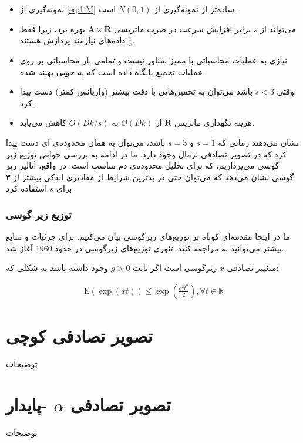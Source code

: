 \begin{itemize}
\item
نمونه‌گیری از 
\autoref{eq:1iM}
ساده‌تر از نمونه‌گیری از
$N(0,1)$
است.
\item
می‌تواند از 
$s$
برابر افزایش سرعت در ضرب ماتریسی 
$\mathbf{A} \times \mathbf{R}$
بهره برد، زیرا فقط
$\frac{1}{s}$
داده‌های نیازمند پردازش هستند.
\item
نیازی به عملیات محاسباتی با ممیز شناور نیست و تمامی بار محاسباتی بر روی عملیات تجمیع پایگاه داده است که به خوبی بهینه شده.
\item
وقتی 
$s<3$
باشد می‌توان به تخمین‌هایی با دقت بیشتر (واریانس کمتر) دست پیدا کرد.
\item
هزینه نگهداری ماتریس 
$\mathbf{R}$
از 
$O(Dk)$
به 
$O(Dk/s)$
کاهش می‌یابد.
\end{itemize}

\cite{litez2, litez3}
نشان ‌می‌دهند زمانی که 
$s=1$
و 
$s=3$
باشد، می‌توان به همان محدوده‌ی 
ای دست پیدا کرد که در تصویر تصادفی نرمال وجود دارد. ما در ادامه به بررسی خواص توزیع زیر گوسی می‌پردازیم، که برای تحلیل محدوده‌ی دم مناسب است. در واقع، آنالیز زیر گوسی نشان می‌دهد که می‌توان حتی در بدترین شرایط از مقادیری اندکی بیشتر از ۳ برای 
$s$
استفاده کرد.

\subsubsection{
توزیع زیر گوسی
}

ما در اینجا مقدمه‌ای کوتاه بر توزیع‌های زیرگوسی بیان می‌کنیم. برای جزئیات و منابع بیشتر می‌توانید به
\cite{litez40}
مراجعه کنید. تئوری توزیع‌های زیرگوسی در حدود 1960 آغاز شد.

متغییر تصادفی 
$x$
زیرگوسی است اگر ثابت 
$g > 0$
وجود داشته باشد به شکلی که:

\begin{align}
\mathrm{E}(\exp (xt)) \leq \exp \left( \frac{g^2 t^2}{2} \right), \forall t \in \mathbb{R}
\label{eq:1iN}
\end{align}





\section{
تصویر تصادفی کوچی
}
توضیحات
\section{
تصویر تصادفی 
$\alpha$
-پایدار
}
توضیحات
